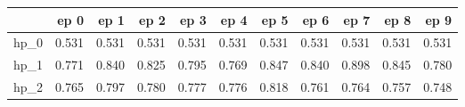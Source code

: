 \begin{tabular}{lrrrrrrrrrr}
\toprule
{} &   ep 0 &   ep 1 &   ep 2 &   ep 3 &   ep 4 &   ep 5 &   ep 6 &   ep 7 &   ep 8 &   ep 9 \\
\midrule
hp\_0 &  0.531 &  0.531 &  0.531 &  0.531 &  0.531 &  0.531 &  0.531 &  0.531 &  0.531 &  0.531 \\
hp\_1 &  0.771 &  0.840 &  0.825 &  0.795 &  0.769 &  0.847 &  0.840 &  0.898 &  0.845 &  0.780 \\
hp\_2 &  0.765 &  0.797 &  0.780 &  0.777 &  0.776 &  0.818 &  0.761 &  0.764 &  0.757 &  0.748 \\
\bottomrule
\end{tabular}
